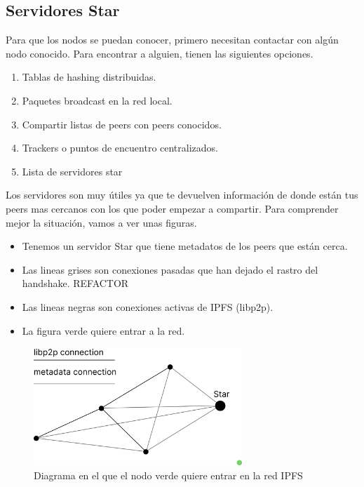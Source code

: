 \subsection{Servidores Star}
Para que los nodos se puedan conocer, primero necesitan contactar con algún nodo conocido.
Para encontrar a alguien, tienen las siguientes opciones.
\begin{enumerate}
    \item Tablas de hashing distribuidas.
    \item Paquetes broadcast en la red local.
    \item Compartir listas de peers con peers conocidos.
    \item Trackers o puntos de encuentro centralizados.
    \item Lista de servidores star
\end{enumerate}
Los servidores son muy útiles ya que te devuelven información de donde están tus peers mas cercanos con los que poder empezar a compartir.
Para comprender mejor la situación, vamos a ver unas figuras.
\begin{itemize}
    \item Tenemos un servidor Star que tiene metadatos de los peers que están cerca.
    \item Las lineas grises son conexiones pasadas que han dejado el rastro del handshake. REFACTOR
    \item Las lineas negras son conexiones activas de IPFS \cite{web:ipfs} (libp2p).
    \item La figura verde quiere entrar a la red.
\end{itemize}
\begin{figure}[h!]
    \centering
    \includegraphics[width=0.7\textwidth]{Figures/Green wants to join(2).png}
    \caption{Diagrama en el que el nodo verde quiere entrar en la red IPFS \cite{web:ipfs}}
    \label{fg:scanning_ipfs}
\end{figure}
